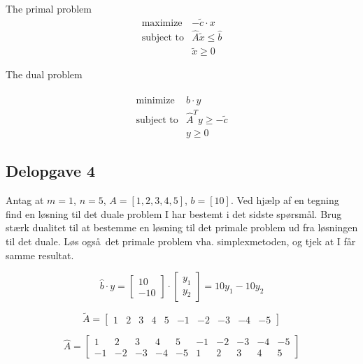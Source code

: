 \documentclass{article}
\begin{document}
The primal problem
\begin{equation}
    \begin{array}{ll}
        \text{maximize}   & -\tilde{c} \cdot x \\
        \text{subject to} & \hat{A}\tilde{x} \leq \hat{b} \\
                          & \tilde{x} \geq 0
    \end{array}
\end{equation}

The dual problem

\begin{equation}
    \begin{array}{ll}
        \text{minimize}   & \hat{b} \cdot y \\
        \text{subject to} & \hat{A}^Ty \geq -\tilde{c} \\
                          & y \geq 0
    \end{array}
\end{equation}

\subsection{Delopgave 4}
Antag at $m = 1$, $n = 5$, $A = [1,2,3,4,5]$, $b=[10]$. Ved hj\ae lp af en tegning find en l\o sning til det duale problem I har bestemt i det sidste sp\o rsm\aa l. Brug st\ae rk dualitet til at bestemme en l\o sning til det primale problem ud fra l\o sningen til det duale. L\o s ogs\aa\ det primale problem vha. simplexmetoden, og tjek at I f\aa r samme resultat.

\begin{equation}
    \hat{b} \cdot y =
    \begin{bmatrix}
        10 \\
        -10
    \end{bmatrix}
    \cdot
    \begin{bmatrix}
        y_1 \\
        y_2
    \end{bmatrix}
    =
    10y_1 - 10y_2
\end{equation}

\begin{equation}
    \tilde{A} =
    \begin{bmatrix}
        1 & 2 & 3 & 4 & 5 & -1 & -2 & -3 & -4 & -5
    \end{bmatrix}
\end{equation}

\begin{equation}
    \hat{A} =
    \begin{bmatrix}
        1 & 2 & 3 & 4 & 5 & -1 & -2 & -3 & -4 & -5 \\
        -1 & -2 & -3 & -4 & -5 & 1 & 2 & 3 & 4 & 5
    \end{bmatrix}
\end{equation}
\end{document}
